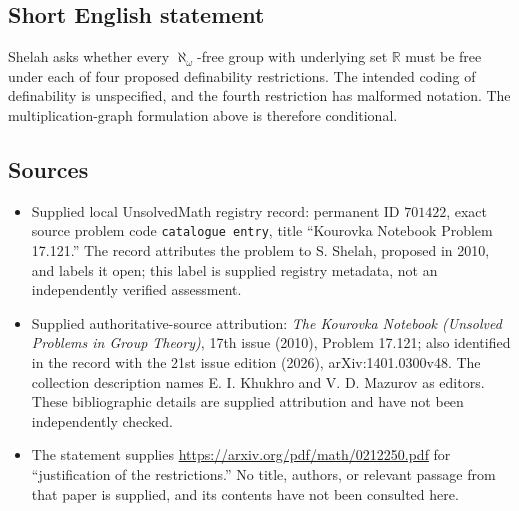 \documentclass[11pt]{article}
\newcommand{\R}{\mathbb{R}}
\begin{document}
\subsection{Short English statement}
Shelah asks whether every \(\aleph_\omega\)-free group with underlying set \(\R\) must be free under each of four proposed definability restrictions. The intended coding of definability is unspecified, and the fourth restriction has malformed notation. The multiplication-graph formulation above is therefore conditional.
\subsection{Sources}
\begin{itemize}
\item Supplied local UnsolvedMath registry record: permanent ID \(701422\), exact source problem code \texttt{catalogue entry}, title ``Kourovka Notebook Problem 17.121.'' The record attributes the problem to S. Shelah, proposed in 2010, and labels it open; this label is supplied registry metadata, not an independently verified assessment.
\item Supplied authoritative-source attribution: \emph{The Kourovka Notebook (Unsolved Problems in Group Theory)}, 17th issue (2010), Problem 17.121; also identified in the record with the 21st issue edition (2026), arXiv:1401.0300v48. The collection description names E. I. Khukhro and V. D. Mazurov as editors. These bibliographic details are supplied attribution and have not been independently checked.
\item The statement supplies \url{https://arxiv.org/pdf/math/0212250.pdf} for ``justification of the restrictions.'' No title, authors, or relevant passage from that paper is supplied, and its contents have not been consulted here.
\end{itemize}
\end{document}
